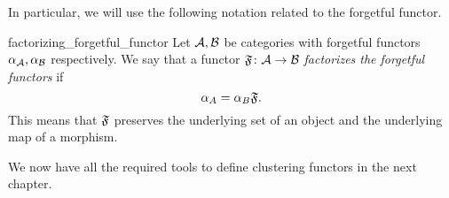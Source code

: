 In particular, we will use the following notation related to the forgetful functor.

\begin{definition}{}{factorizing_forgetful_functor}
Let $\mathcal{A}, \mathcal{B}$ be categories with forgetful functors $\alpha_{\mathcal{A}}, \alpha_{\mathcal{B}}$ respectively. We say that a functor $\mathfrak{F}\colon \mathcal{A} \to \mathcal{B}$ \emph{factorizes the forgetful functors} if
\begin{equation*}
    \alpha_A = \alpha_B \mathfrak{F}.
\end{equation*}
This means that $\mathfrak{F}$ preserves the underlying set of an object and the underlying map of a morphism.
\end{definition}

\medskip We now have all the required tools to define clustering functors in the next chapter.